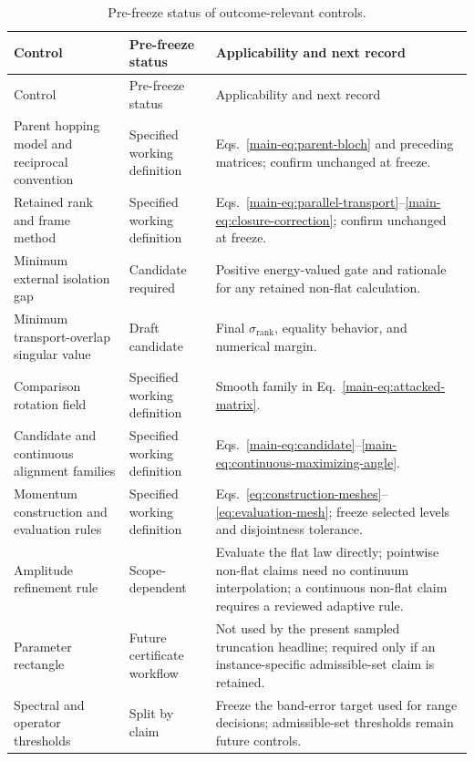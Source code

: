 \documentclass[11pt]{article}
\begin{document}
\small
\begin{longtable}{@{}>{\raggedright\arraybackslash}p{}
                      >{\raggedright\arraybackslash}p{}
                      >{\raggedright\arraybackslash}p{}@{}}
\caption{Pre-freeze status of outcome-relevant controls.}
\label{tab:controls}\\
\toprule
Control & Pre-freeze status & Applicability and next record \\
\midrule
\endfirsthead
\toprule
Control & Pre-freeze status & Applicability and next record \\
\midrule
\endhead
Parent hopping model and reciprocal convention & Specified working definition &
Eqs.~\eqref{main-eq:parent-bloch} and preceding matrices; confirm unchanged at freeze. \\
Retained rank and frame method & Specified working definition &
Eqs.~\eqref{main-eq:parallel-transport}--\eqref{main-eq:closure-correction}; confirm unchanged at freeze. \\
Minimum external isolation gap & Candidate required & Positive energy-valued gate and rationale for any retained non-flat calculation. \\
Minimum transport-overlap singular value & Draft candidate & Final $\sigma_{\mathrm{rank}}$, equality behavior, and numerical margin. \\
Comparison rotation field & Specified working definition & Smooth family in Eq.~\eqref{main-eq:attacked-matrix}. \\
Candidate and continuous alignment families & Specified working definition &
Eqs.~\eqref{main-eq:candidate}--\eqref{main-eq:continuous-maximizing-angle}. \\
Momentum construction and evaluation rules & Specified working definition &
Eqs.~\eqref{eq:construction-meshes}--\eqref{eq:evaluation-mesh}; freeze selected levels and disjointness tolerance. \\
Amplitude refinement rule & Scope-dependent & Evaluate the flat law directly; pointwise non-flat claims need no continuum interpolation; a continuous non-flat claim requires a reviewed adaptive rule. \\
Parameter rectangle & Future certificate workflow & Not used by the present sampled truncation headline; required only if an instance-specific admissible-set claim is retained. \\
Spectral and operator thresholds & Split by claim & Freeze the band-error target used for range decisions; admissible-set thresholds remain future controls. \\

\end{longtable}
\end{document}
